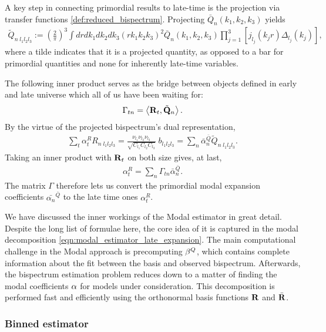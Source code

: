 A key step in connecting primordial results to late-time is the projection via transfer functions \eqref{def:reduced_bispectrum}. Projecting $\bar{Q}_n(k_1,k_2,k_3)$ yields
\begin{align}
	\tilde{Q}_{n \; l_1 l_2 l_3} := \left( \frac{2}{\pi} \right)^3 \int dr dk_1 dk_2 dk_3 \left(r k_1 k_2 k_3 \right)^2 \bar{Q}_n (k_1, k_2, k_3) \prod_{j=1}^{3} \left[ j_{l_j} (k_j r) \Delta_{l_j} (k_j) \right],
\end{align}
where a tilde indicates that it is a projected quantity, as opposed to a bar for primordial quantities and none for inherently late-time variables. 

The following inner product serves as the bridge between objects defined in early and late universe which all of us have been waiting for:
\begin{align}
	\Gamma_{tn} = \left< \mathbf{R}_{t}, \tilde{\mathbf{Q}}_n \right>.
\end{align}
By the virtue of the projected bispectrum's dual representation,
\begin{align}
	\sum_t \alpha^R_t R_{n \; l_1 l_2 l_3} = \frac{\nu_{l_1} \nu_{l_2} \nu_{l_3}}{\sqrt{C_{l_1} C_{l_2} C_{l_3}}} \; b_{l_1 l_2 l_3} = \sum_n \bar{\alpha}^{\bar{Q}}_n \tilde{Q}_{n \; l_1 l_2 l_3}.
\end{align}
Taking an inner product with $\mathbf{R}_t$ on both size gives, at last,
\begin{align}
	\alpha^R_t = \sum_n \Gamma_{tn} \bar{\alpha}^{\bar{Q}}_n.
\end{align}
The matrix $\Gamma$ therefore lets us convert the primordial modal expansion coefficients $\bar{\alpha_n}^{\bar{Q}}$ to the late time ones $\alpha_t^{R}$.

\hspace{10pt}

We have discussed the inner workings of the Modal estimator in great detail. Despite the long list of formulae here, the core idea of it is captured in the modal decomposition \eqref{eqn:modal_estimator_late_expansion}. The main computational challenge in the Modal approach is precomputing $\mathbf{\beta}^Q$, which contains complete information about the fit between the basis and observed bispectrum. Afterwards, the bispectrum estimation problem reduces down to a matter of finding the modal coefficients $\mathbf{\alpha}$ for models under consideration. This decomposition is performed fast and efficiently using the orthonormal basis functions $\mathbf{R}$ and $\bar{\mathbf{R}}$.

\subsubsection*{Binned estimator}

